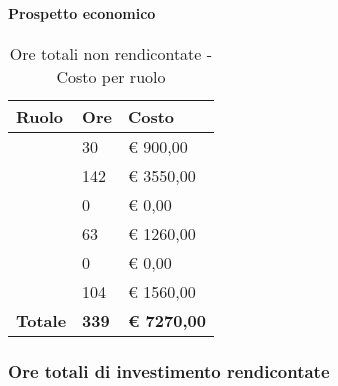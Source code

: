 			\paragraph{Prospetto economico} %
			\label{par:prospetto_economico}
				\begin{table}[!h]
					\begin{center}
						\begin{tabularx}{0.65\textwidth}{|l|l|X|}
							\hline
							\textbf{Ruolo} & \textbf{Ore} & \textbf{Costo} \\
							\hline
							\roleProjectManager & 30 & \euro{} 900,00 \\
							\hline
							\roleAnalyst & 142 & \euro{} 3550,00 \\
							\hline
							\roleDesigner & 0 & \euro{} 0,00 \\
							\hline
							\roleAdministrator & 63 & \euro{} 1260,00 \\
							\hline
							\roleProgrammer & 0 & \euro{} 0,00 \\
							\hline
							\roleVerifier & 104 & \euro{} 1560,00 \\
							\hline
							\textbf{Totale} & \textbf{339} & \textbf{\euro{} 7270,00} \\
							\hline
						\end{tabularx}
					\end{center}
				\caption{Ore totali non rendicontate - Costo per ruolo}
				\end{table}
			
		
		\subsubsection{Ore totali di investimento rendicontate} %
		\label{ssub:ore_totali_di_investimento}
